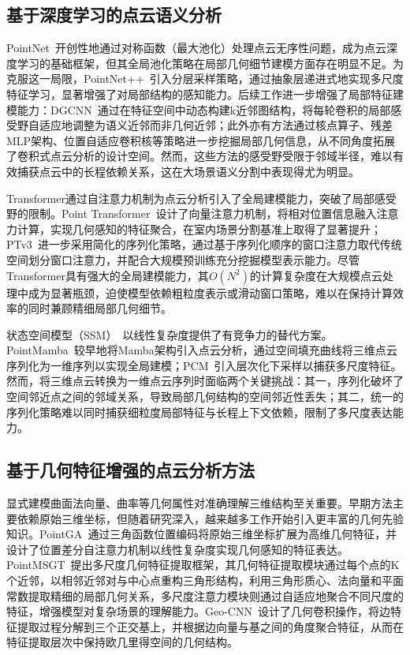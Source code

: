 \documentclass[12pt,a4paper,openany,oneside]{ctexbook}
\theoremstyle{definition}
\theoremstyle{remark}
\begin{document}
\subsection{基于深度学习的点云语义分析}
PointNet~\cite{pointnet}开创性地通过对称函数（最大池化）处理点云无序性问题，成为点云深度学习的基础框架，但其全局池化策略在局部几何细节建模方面存在明显不足。为克服这一局限，PointNet++~\cite{PointNetpp}引入分层采样策略，通过抽象层递进式地实现多尺度特征学习，显著增强了对局部结构的感知能力。后续工作进一步增强了局部特征建模能力：DGCNN~\cite{DGCNN}通过在特征空间中动态构建k近邻图结构，将每轮卷积的局部感受野自适应地调整为语义近邻而非几何近邻；此外亦有方法通过核点算子、残差MLP架构、位置自适应卷积核等策略进一步挖掘局部几何信息，从不同角度拓展了卷积式点云分析的设计空间。然而，这些方法的感受野受限于邻域半径，难以有效捕获点云中的长程依赖关系，这在大场景语义分割中表现得尤为明显。

Transformer通过自注意力机制为点云分析引入了全局建模能力，突破了局部感受野的限制。Point Transformer~\cite{pt}设计了向量注意力机制，将相对位置信息融入注意力计算，实现几何感知的特征聚合，在室内场景分割基准上取得了显著提升；PTv3~\cite{ptv3}进一步采用简化的序列化策略，通过基于序列化顺序的窗口注意力取代传统空间划分窗口注意力，并配合大规模预训练充分挖掘模型表示能力。尽管Transformer具有强大的全局建模能力，其$O(N^2)$的计算复杂度在大规模点云处理中成为显著瓶颈，迫使模型依赖粗粒度表示或滑动窗口策略，难以在保持计算效率的同时兼顾精细局部几何细节。

状态空间模型（SSM）~\cite{Mamba}以线性复杂度提供了有竞争力的替代方案。PointMamba~\cite{PointMamba}较早地将Mamba架构引入点云分析，通过空间填充曲线将三维点云序列化为一维序列以实现全局建模；PCM~\cite{pcm}引入层次化下采样以捕获多尺度特征。然而，将三维点云转换为一维点云序列时面临两个关键挑战：其一，序列化破坏了空间邻近点之间的邻域关系，导致局部几何结构的空间邻近性丢失；其二，统一的序列化策略难以同时捕获细粒度局部特征与长程上下文依赖，限制了多尺度表达能力。

\subsection{基于几何特征增强的点云分析方法}
显式建模曲面法向量、曲率等几何属性对准确理解三维结构至关重要。早期方法主要依赖原始三维坐标，但随着研究深入，越来越多工作开始引入更丰富的几何先验知识。PointGA~\cite{pointga}通过三角函数位置编码将原始三维坐标扩展为高维几何特征，并设计了位置差分自注意力机制以线性复杂度实现几何感知的特征表达。PointMSGT~\cite{pointmsgt}提出多尺度几何特征提取框架，其几何特征提取模块通过每个点的K个近邻，以相邻近邻对与中心点重构三角形结构，利用三角形质心、法向量和平面常数提取精细的局部几何关系，多尺度注意力模块则通过自适应地聚合不同尺度的特征，增强模型对复杂场景的理解能力。Geo-CNN~\cite{geo-cnn}设计了几何卷积操作，将边特征提取过程分解到三个正交基上，并根据边向量与基之间的角度聚合特征，从而在特征提取层次中保持欧几里得空间的几何结构。
\end{document}
